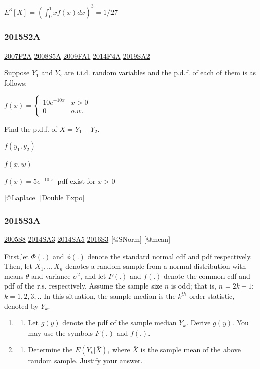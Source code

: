 \documentclass[6pt,twocolumn,Portrait]{article}
\providecommand{\tightlist}{%
  \setlength{\itemsep}{0pt}\setlength{\parskip}{0pt}}
\begin{document}
\(E^3[X]=(\int_0^1xf(x)dx)^3=1/27\)

\hypertarget{s2a-1}{%
\subsubsection{2015S2A}\label{s2a-1}}

\protect\hyperlink{f2a}{2007F2A} \protect\hyperlink{s5a}{2008S5A}
\protect\hyperlink{fa1}{2009FA1} \protect\hyperlink{f4a-1}{2014F4A}
\protect\hyperlink{sa2-3}{2019SA2}

Suppose \(Y_1\) and \(Y_2\) are i.i.d. random variables and the p.d.f.
of each of them is as follows:

\(f(x)=\begin{cases}10e^{-10x}& x>0\\0& o.w.\end{cases}\)

Find the p.d.f. of \(X=Y_1-Y_2\).

\(f(y_1,y_2)\)

\(f(x,w)\)

\(f(x)=5e^{-10|x|}\) pdf exist for \(x>0\)

{[}@Laplace{]} {[}Double Expo{]}

\hypertarget{s3a-1}{%
\subsubsection{2015S3A}\label{s3a-1}}

\protect\hyperlink{s8-1}{2005S8} \protect\hyperlink{sa3-2}{2014SA3}
\protect\hyperlink{sa5-1}{2014SA5} \protect\hyperlink{s3-4}{2016S3}
{[}@SNorm{]} {[}@mean{]}

First,let \(\Phi(.)\) and \(\phi(.)\) denote the standard normal cdf and
pdf respectively. Then, let \(X_1,..,X_n\) denotes a random sample from
a normal distribution with means \(\theta\) and variance \(\sigma^2\),
and let \(F(.)\) and \(f(.)\) denote the common cdf and pdf of the r.s.
respectively. Assume the sample size \(n\) is odd; that is, \(n=2k-1\);
\(k=1,2,3,..\) In this situation, the sample median is the \(k^{th}\)
order statistic, denoted by \(Y_k\).

\begin{enumerate}
\def\labelenumi{(\alph{enumi})}
\item
  \begin{enumerate}
  \def\labelenumii{(\arabic{enumii})}
  \setcounter{enumii}{4}
  \tightlist
  \item
    Let \(g(y)\) denote the pdf of the sample median \(Y_k\). Derive
    \(g(y)\). You may use the symbols \(F(.)\) and \(f(.)\).
  \end{enumerate}
\item
  \begin{enumerate}
  \def\labelenumii{(\arabic{enumii})}
  \setcounter{enumii}{4}
  \tightlist
  \item
    Determine the \(E(Y_k|\bar X)\), where \(\bar X\) is the sample mean
    of the above random sample. Justify your answer.
  \end{enumerate}
\end{enumerate}
\end{document}

